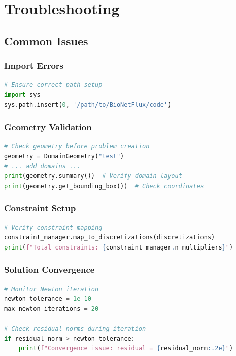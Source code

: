 \section{Troubleshooting}

\subsection{Common Issues}

\subsubsection{Import Errors}
\begin{lstlisting}[language=Python, caption={Path Setup}]
# Ensure correct path setup
import sys
sys.path.insert(0, '/path/to/BioNetFlux/code')
\end{lstlisting}

\subsubsection{Geometry Validation}
\begin{lstlisting}[language=Python, caption={Geometry Debugging}]
# Check geometry before problem creation
geometry = DomainGeometry("test")
# ... add domains ...
print(geometry.summary())  # Verify domain layout
print(geometry.get_bounding_box())  # Check coordinates
\end{lstlisting}

\subsubsection{Constraint Setup}
\begin{lstlisting}[language=Python, caption={Constraint Verification}]
# Verify constraint mapping
constraint_manager.map_to_discretizations(discretizations)
print(f"Total constraints: {constraint_manager.n_multipliers}")
\end{lstlisting}

\subsubsection{Solution Convergence}
\begin{lstlisting}[language=Python, caption={Convergence Monitoring}]
# Monitor Newton iteration
newton_tolerance = 1e-10
max_newton_iterations = 20

# Check residual norms during iteration
if residual_norm > newton_tolerance:
    print(f"Convergence issue: residual = {residual_norm:.2e}")
\end{lstlisting}

